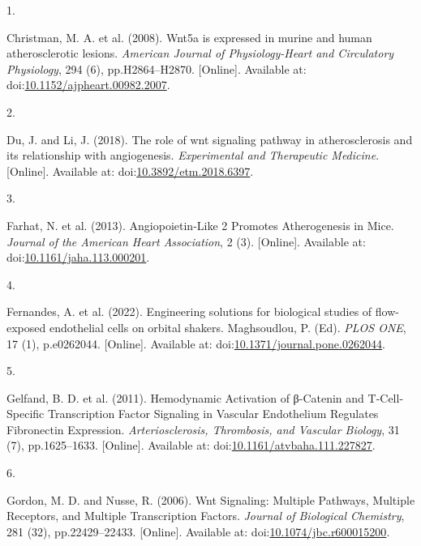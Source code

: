 \documentclass[
  11pt,
]{article}
\newlength{\cslhangindent}
\newlength{\csllabelwidth}
\newlength{\cslentryspacingunit} %
\newenvironment{CSLReferences}[2] %
 {%
  \setlength{\parindent}{0pt}
  \ifodd #1
  \let\oldpar\par
  \def\par{\hangindent=\cslhangindent\oldpar}
  \fi
  \setlength{\parskip}{#2\cslentryspacingunit}
 }%
 {}
\newcommand{\CSLLeftMargin}[1]{\parbox[t]{\csllabelwidth}{#1}}
\newcommand{\CSLRightInline}[1]{\parbox[t]{\linewidth - \csllabelwidth}{#1}\break}
\begin{document}
\hypertarget{refs}{}
\begin{CSLReferences}{0}{0}
\leavevmode{}%
\CSLLeftMargin{1. }
\CSLRightInline{Christman, M. A. {et al.} (2008). {Wnt5a is expressed in murine and human atherosclerotic lesions}. \emph{American Journal of Physiology-Heart and Circulatory Physiology}, 294 (6), pp.H2864--H2870. {[}Online{]}. Available at: doi:\href{https://doi.org/10.1152/ajpheart.00982.2007}{10.1152/ajpheart.00982.2007}.}

\leavevmode{}%
\CSLLeftMargin{2. }
\CSLRightInline{Du, J. and Li, J. (2018). {The role of wnt signaling pathway in atherosclerosis and its relationship with angiogenesis}. \emph{Experimental and Therapeutic Medicine}. {[}Online{]}. Available at: doi:\href{https://doi.org/10.3892/etm.2018.6397}{10.3892/etm.2018.6397}.}

\leavevmode{}%
\CSLLeftMargin{3. }
\CSLRightInline{Farhat, N. {et al.} (2013). {Angiopoietin{-}Like 2 Promotes Atherogenesis in Mice}. \emph{Journal of the American Heart Association}, 2 (3). {[}Online{]}. Available at: doi:\href{https://doi.org/10.1161/jaha.113.000201}{10.1161/jaha.113.000201}.}

\leavevmode{}%
\CSLLeftMargin{4. }
\CSLRightInline{Fernandes, A. {et al.} (2022). {Engineering solutions for biological studies of flow-exposed endothelial cells on orbital shakers}. Maghsoudlou, P. (Ed). \emph{PLOS ONE}, 17 (1), p.e0262044. {[}Online{]}. Available at: doi:\href{https://doi.org/10.1371/journal.pone.0262044}{10.1371/journal.pone.0262044}.}

\leavevmode{}%
\CSLLeftMargin{5. }
\CSLRightInline{Gelfand, B. D. {et al.} (2011). {Hemodynamic Activation of β-Catenin and T-Cell-Specific Transcription Factor Signaling in Vascular Endothelium Regulates Fibronectin Expression}. \emph{Arteriosclerosis, Thrombosis, and Vascular Biology}, 31 (7), pp.1625--1633. {[}Online{]}. Available at: doi:\href{https://doi.org/10.1161/atvbaha.111.227827}{10.1161/atvbaha.111.227827}.}

\leavevmode{}%
\CSLLeftMargin{6. }
\CSLRightInline{Gordon, M. D. and Nusse, R. (2006). {Wnt Signaling: Multiple Pathways, Multiple Receptors, and Multiple Transcription Factors}. \emph{Journal of Biological Chemistry}, 281 (32), pp.22429--22433. {[}Online{]}. Available at: doi:\href{https://doi.org/10.1074/jbc.r600015200}{10.1074/jbc.r600015200}.}


\end{CSLReferences}
\end{document}
